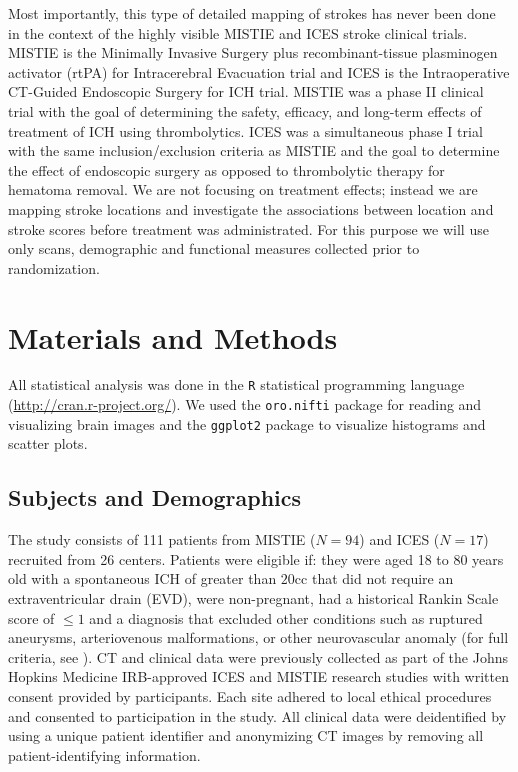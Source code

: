 \documentclass[10pt]{article}\usepackage[]{graphicx}\usepackage[]{color}
\begin{document}
Most importantly, this type of detailed mapping of strokes has never been done in the context of the highly visible MISTIE and ICES stroke clinical trials. MISTIE is the Minimally Invasive Surgery plus recombinant-tissue plasminogen activator (rtPA) for Intracerebral Evacuation trial and ICES is the Intraoperative CT-Guided Endoscopic Surgery for ICH trial.  MISTIE was a phase II clinical trial with the goal of determining the safety, efficacy, and long-term effects of treatment of ICH using thrombolytics.  ICES was a simultaneous phase I trial with the same inclusion/exclusion criteria as MISTIE and the goal to determine the effect of endoscopic surgery as opposed to thrombolytic therapy for hematoma removal.  
We are not focusing on treatment effects; instead we are mapping stroke locations and investigate the associations between location and stroke scores before treatment was administrated. For this purpose we will use only scans, demographic and functional measures collected prior to randomization. 

\section{Materials and Methods}

All statistical analysis was done in the \verb|R| statistical programming language (\url{http://cran.r-project.org/}).  We used the \verb|oro.nifti| package \citep{whitcher_working_2011} for reading and visualizing brain images and the \verb|ggplot2| package \citep{wickham_ggplot2:_2009} to visualize histograms and scatter plots.

\subsection{Subjects and Demographics}
The study consists of 111 patients from MISTIE ($N=94$) and ICES ($N = 17$) recruited from 26 centers.  Patients were eligible if: they were aged 18 to 80 years old with a spontaneous ICH of greater than $20$cc that did not require an extraventricular drain (EVD), were non-pregnant, had a historical Rankin Scale \citep{rankin_cerebral_1957, swieten_interobserver_1988} score of $≤ 1$ and a diagnosis that excluded other conditions such as ruptured aneurysms, arteriovenous malformations, or other neurovascular anomaly (for full criteria, see \citet{mould_minimally_2013}).  CT and clinical data were previously collected as part of the Johns Hopkins Medicine IRB-approved ICES and MISTIE research studies with written consent provided by participants.  Each site adhered to local ethical procedures and consented to participation in the study.  All clinical data were deidentified by using a unique patient identifier and anonymizing CT images by removing all patient-identifying information.  
\end{document}
